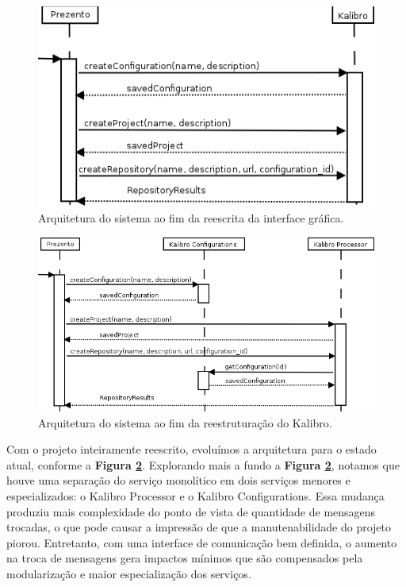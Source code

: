 \documentclass{llncs}
\begin{document}
  \begin{figure}[htb]
    \centering
    \includegraphics[scale=0.5]{images/prev_processing_seq_diag.png}
    \caption{Arquitetura do sistema ao fim da reescrita da interface gráfica.}
    \label{fig:architecture-1}
  \end{figure}

\begin{figure}[htb]
    \centering
      \includegraphics[scale=0.45]{images/processing_seq_diag.png}
    \caption{Arquitetura do sistema ao fim da reestruturação do Kalibro.}
    \label{fig:architecture-2}
  \end{figure}

Com o projeto inteiramente reescrito, evoluímos a arquitetura para o estado
atual, conforme a \textbf{Figura \ref{fig:architecture-2}}.
%
Explorando mais a fundo a \textbf{Figura \ref{fig:architecture-2}}, notamos que
houve uma separação do serviço monolítico em dois serviços menores e
especializados: o Kalibro Processor e o Kalibro Configurations.
%
Essa mudança produziu mais complexidade do ponto de vista de quantidade de
mensagens trocadas, o que pode causar a impressão de que a manutenabilidade do
projeto piorou. Entretanto, com uma interface de comunicação bem definida, o
aumento na troca de mensagens gera impactos mínimos que são compensados pela
modularização e maior especialização dos serviços.
\end{document}
